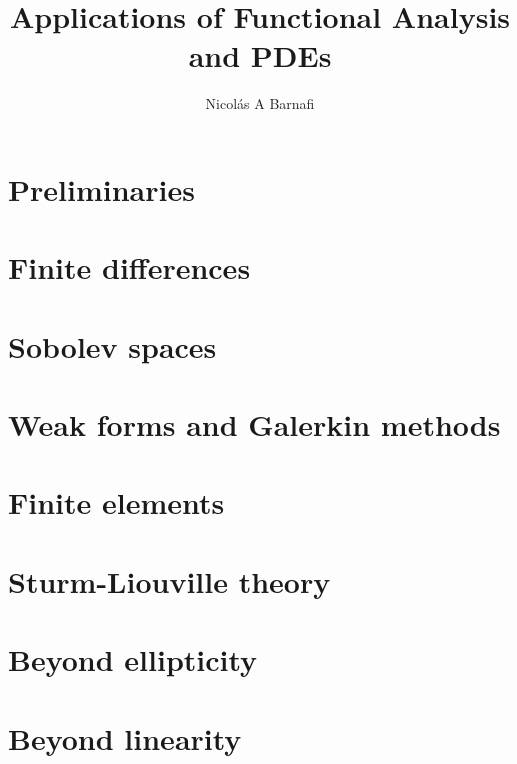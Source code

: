\documentclass{scrbook}
\title{Applications of Functional Analysis and PDEs}
\author{Nicol\'as A Barnafi}
\date{} %
\begin{document}
\maketitle
\tableofcontents
\mainmatter



\chapter{Preliminaries}\label{chapter:preliminaries}

\chapter{Finite differences}\label{chapter:finite-differences}

\chapter{Sobolev spaces}\label{chapter:sobolev}

\chapter{Weak forms and Galerkin methods}\label{chapter:weak-forms-galerkin}

\chapter{Finite elements}\label{chapter:fem}

\chapter{Sturm-Liouville theory}\label{chapter:sturm-liouville}

\chapter{Beyond ellipticity}\label{chapter:beyond-ellipticity}

\chapter{Beyond linearity}\label{chapter:nonlinear}

\end{document}
